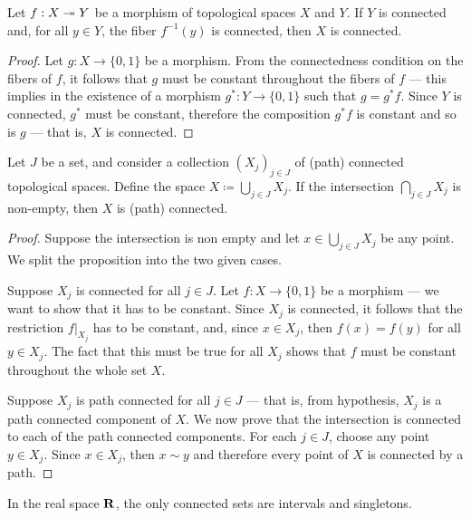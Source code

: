 \begin{proposition}
\label{prop:connectivity-quotients}
Let \(f: X \twoheadrightarrow Y\) be a morphism of topological spaces \(X\) and \(Y\). If
\(Y\) is connected and, for all \(y \in Y\), the fiber \(f^{-1}(y)\) is
connected, then \(X\) is connected.
\end{proposition}

\begin{proof}
Let \(g: X \to \{0, 1\}\) be a morphism. From the connectedness condition on the
fibers of \(f\), it follows that \(g\) must be constant throughout the fibers of
\(f\) --- this implies in the existence of a morphism \(g^{*}: Y \to \{0, 1\}\)
such that \(g = g^{*} f\). Since \(Y\) is connected, \(g^{*}\) must be constant,
therefore the composition \(g^{*} f\) is constant and so is \(g\) --- that is,
\(X\) is connected.
\end{proof}

\begin{proposition}
\label{prop:union-path-connected}
Let \(J\) be a set, and consider a collection \((X_j)_{j \in J}\) of (path)
connected topological spaces. Define the space
\(X \coloneq \bigcup_{j \in J} X_j\). If the intersection
\(\bigcap_{j \in J} X_j\) is non-empty, then \(X\) is (path) connected.
\end{proposition}

\begin{proof}
Suppose the intersection is non empty and let \(x \in \bigcup_{j \in J}
X_j\) be any point. We split the proposition into the two given cases.

Suppose \(X_j\) is connected for all \(j \in J\). Let \(f: X \to \{0, 1\}\) be a
morphism --- we want to show that it has to be constant. Since \(X_j\) is
connected, it follows that the restriction \(f|_{X_j}\) has to be constant, and,
since \(x \in X_j\), then \(f(x) = f(y)\) for all \(y \in X_j\). The fact that
this must be true for all \(X_j\) shows that \(f\) must be constant throughout
the whole set \(X\).

Suppose \(X_j\) is path connected for all \(j \in J\) --- that is, from
hypothesis, \(X_j\) is a path connected component of \(X\). We now prove that
the intersection is connected to each of the path connected components. For each
\(j \in J\), choose any point \(y \in X_j\). Since \(x \in X_j\), then
\(x \sim y\) and therefore every point of \(X\) is connected by a path.
\end{proof}

\begin{theorem}
\label{thm:connected-interval-real-space}
In the real space \(\mathbf{R}\), the only connected sets are intervals and singletons.
\end{theorem}

